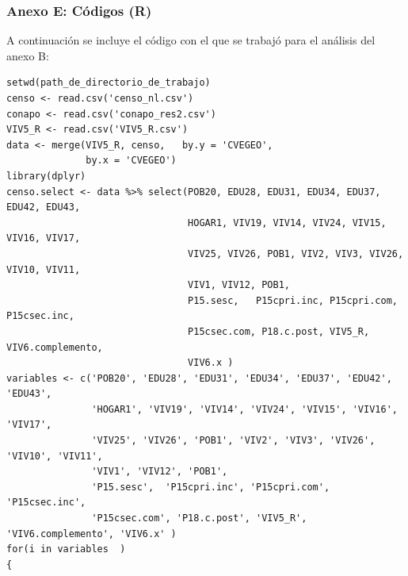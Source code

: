 \documentclass[paper=letter, fontsize=11pt]{scrartcl}
\numberwithin{equation}{section} %
\numberwithin{figure}{section} %
\numberwithin{table}{section} %
\begin{document}
\begin{enumerate}
\begin{enumerate}
\subsubsection{Anexo E: Códigos (R)}
A continuación se incluye el código con el que se trabajó para el análisis del anexo B:
\begin{lstlisting}[style=customc,basicstyle=\scriptsize]
setwd(path_de_directorio_de_trabajo)
censo <- read.csv('censo_nl.csv')
conapo <- read.csv('conapo_res2.csv')
VIV5_R <- read.csv('VIV5_R.csv')
data <- merge(VIV5_R, censo,   by.y = 'CVEGEO',
              by.x = 'CVEGEO')
library(dplyr)
censo.select <- data %>% select(POB20, EDU28, EDU31, EDU34, EDU37, EDU42, EDU43,
                                HOGAR1, VIV19, VIV14, VIV24, VIV15, VIV16, VIV17,
                                VIV25, VIV26, POB1, VIV2, VIV3, VIV26, VIV10, VIV11,
                                VIV1, VIV12, POB1, 
                                P15.sesc,	P15cpri.inc, P15cpri.com,	P15csec.inc,
                                P15csec.com, P18.c.post, VIV5_R, VIV6.complemento,
                                VIV6.x )
variables <- c('POB20', 'EDU28', 'EDU31', 'EDU34', 'EDU37', 'EDU42', 'EDU43',
               'HOGAR1', 'VIV19', 'VIV14', 'VIV24', 'VIV15', 'VIV16', 'VIV17',
               'VIV25', 'VIV26', 'POB1', 'VIV2', 'VIV3', 'VIV26', 'VIV10', 'VIV11',
               'VIV1', 'VIV12', 'POB1', 
               'P15.sesc',	'P15cpri.inc', 'P15cpri.com',	'P15csec.inc',
               'P15csec.com', 'P18.c.post',	'VIV5_R',	'VIV6.complemento',	'VIV6.x' )
for(i in variables  )
{
  

\end{lstlisting}
\end{enumerate}
\end{enumerate}
\end{document}
